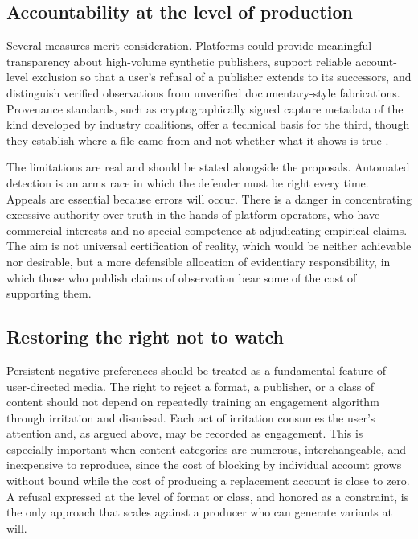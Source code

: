 \documentclass[12pt]{article}
\theoremstyle{plain}
\theoremstyle{definition}
\theoremstyle{remark}
\begin{document}
\subsection{Accountability at the level of production}

Several measures merit consideration. Platforms could provide meaningful transparency about high-volume synthetic publishers, support reliable account-level exclusion so that a user's refusal of a publisher extends to its successors, and distinguish verified observations from unverified documentary-style fabrications. Provenance standards, such as cryptographically signed capture metadata of the kind developed by industry coalitions, offer a technical basis for the third, though they establish where a file came from and not whether what it shows is true \cite{c2pa}.

The limitations are real and should be stated alongside the proposals. Automated detection is an arms race in which the defender must be right every time. Appeals are essential because errors will occur. There is a danger in concentrating excessive authority over truth in the hands of platform operators, who have commercial interests and no special competence at adjudicating empirical claims. The aim is not universal certification of reality, which would be neither achievable nor desirable, but a more defensible allocation of evidentiary responsibility, in which those who publish claims of observation bear some of the cost of supporting them.

\subsection{Restoring the right not to watch}

Persistent negative preferences should be treated as a fundamental feature of user-directed media. The right to reject a format, a publisher, or a class of content should not depend on repeatedly training an engagement algorithm through irritation and dismissal. Each act of irritation consumes the user's attention and, as argued above, may be recorded as engagement. This is especially important when content categories are numerous, interchangeable, and inexpensive to reproduce, since the cost of blocking by individual account grows without bound while the cost of producing a replacement account is close to zero. A refusal expressed at the level of format or class, and honored as a constraint, is the only approach that scales against a producer who can generate variants at will.
\end{document}
